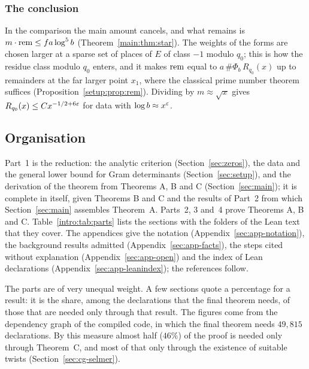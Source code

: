 \subsubsection*{The conclusion}
In the comparison the main amount cancels, and what remains is $m\cdot\mathrm{rem} \le f a\log^5 b$
(Theorem~\ref{main:thm:star}). The weights of the forms are chosen larger at a sparse set of
places of $E$ of class $-1$ modulo $q_0$; this is how the residue class modulo $q_0$ enters, and
it makes $\mathrm{rem}$ equal to $a\,\#\Phi_b\,R_{q_0}(x)$ up to remainders at the far larger point $x_1$,
where the classical prime number theorem suffices (Proposition~\ref{setup:prop:rem}). Dividing by
$m \approx \sqrt{x}$ gives $R_{q_0}(x) \le C x^{-1/2+6\varepsilon}$ for data with $\log b \approx x^\varepsilon$.

\subsection{Organisation}

Part~1 is the reduction: the analytic criterion (Section~\ref{sec:zeros}), the data and the
general lower bound for Gram determinants (Section~\ref{sec:setup}), and the derivation of the
theorem from Theorems A, B and C (Section~\ref{sec:main}); it is complete in itself, given
Theorems B and C and the results of Part~2 from which Section~\ref{sec:main} assembles Theorem~A. Parts~2, 3 and~4 prove Theorems A, B and C. Table~\ref{intro:tab:parts} lists the
sections with the folders of the Lean text that they cover. The appendices give the notation
(Appendix~\ref{sec:app-notation}), the background results admitted
(Appendix~\ref{sec:app-facts}), the steps cited without explanation
(Appendix~\ref{sec:app-open}) and the index of Lean declarations
(Appendix~\ref{sec:app-leanindex}); the references follow.

The parts are of very unequal weight. A few sections quote a percentage for a result: it is the
share, among the declarations that the final theorem  needs, of those
that are needed only through that result. The figures come from the dependency graph of the
compiled code, in which the final theorem needs $49{,}815$ declarations. By this measure almost
half ($46\%$) of the proof is needed only through Theorem~C, and most of that only through the
existence of suitable twists (Section~\ref{sec:cg-selmer}).

